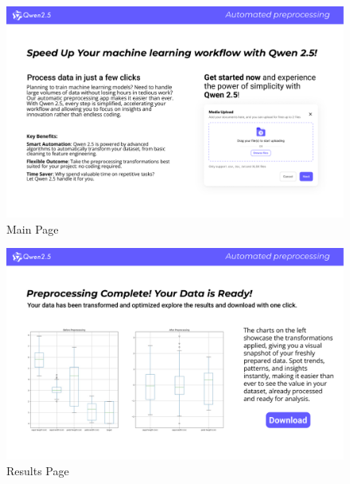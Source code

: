 \begin{figure}[H]
    \centering
    \includegraphics[width=1\textwidth]{media/App_prototipo_1.pdf}
    \caption{Main Page}\label{fig:app_mockup_1}
\end{figure}

\begin{figure}[H]
    \centering
    \includegraphics[width=1\textwidth]{media/App_prototipo_2.pdf}
    \caption{Results Page}\label{fig:app_mockup_2}
\end{figure}